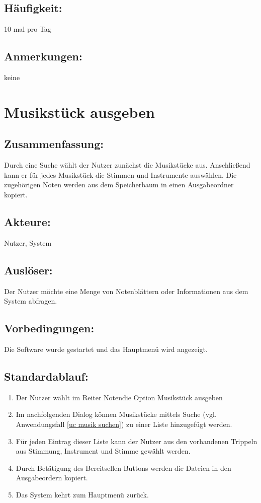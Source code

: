\documentclass[a4paper,10pt]{scrartcl}
\begin{document}
\subsection{Häufigkeit:}
10 mal pro Tag
\subsection{Anmerkungen:}
keine
\newpage

\section{Musikstück ausgeben}
\label{uc musik ausgeben}
\subsection{Zusammenfassung:}
Durch eine Suche wählt der Nutzer zunächst die Musikstücke aus. Anschließend kann er für jedes Musikstück die Stimmen und Instrumente auswählen. Die zugehörigen Noten werden aus dem Speicherbaum in einen Ausgabeordner kopiert.
\subsection{Akteure:}
Nutzer, System
\subsection{Auslöser:}
Der Nutzer möchte eine Menge von Notenblättern oder Informationen aus dem System abfragen.
\subsection{Vorbedingungen:}
Die Software wurde gestartet und das Hauptmenü wird angezeigt.
\subsection{Standardablauf:}
\begin{enumerate}
	\item Der Nutzer wählt im Reiter \glqq Noten\grqq die Option \glqq Musikstück ausgeben\grqq
	\item Im nachfolgenden Dialog können Musikstücke mittels Suche (vgl. Anwendungsfall \ref{uc musik suchen}) zu einer Liste hinzugefügt werden. 
	\item Für jeden Eintrag dieser Liste kann der Nutzer aus den vorhandenen Trippeln aus Stimmung, Instrument und Stimme gewählt werden.
	\item Durch Betätigung des \glqq Bereitsellen\grqq-Buttons werden die Dateien in den Ausgabeordern kopiert.
	\item Das System kehrt zum Hauptmenü zurück. 
\end{enumerate}
\end{document}
